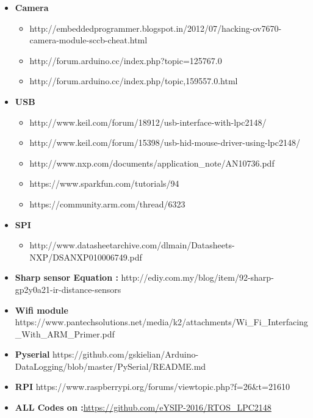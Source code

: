 \documentclass[11pt,a4paper]{book}
\begin{document}
\begin{itemize}
		\item \textbf{Camera}
		\begin{itemize}
			\item	http://embeddedprogrammer.blogspot.in/2012/07/hacking-ov7670-camera-module-sccb-cheat.html
			\item http://forum.arduino.cc/index.php?topic=125767.0
			\item	http://forum.arduino.cc/index.php/topic,159557.0.html 
		\end{itemize}
		
		\item \textbf{USB}
		\begin{itemize}
			\item	http://www.keil.com/forum/18912/usb-interface-with-lpc2148/
			\item	http://www.keil.com/forum/15398/usb-hid-mouse-driver-using-lpc2148/
			\item	http://www.nxp.com/documents/application\_note/AN10736.pdf
			\item	https://www.sparkfun.com/tutorials/94
			\item	https://community.arm.com/thread/6323
			
		\end{itemize}
		
		\item \textbf{SPI}
		\begin{itemize}
			\item http://www.datasheetarchive.com/dlmain/Datasheets-NXP/DSANXP010006749.pdf
			
		\end{itemize}
		
		
		
		\item \textbf{Sharp sensor Equation :}
		http://ediy.com.my/blog/item/92-sharp-gp2y0a21-ir-distance-sensors
		
		\item \textbf{Wifi module}
		https://www.pantechsolutions.net/media/k2/attachments/Wi\_Fi\_Interfacing\_With\_ARM\_Primer.pdf
		
		\item \textbf{Pyserial}
		https://github.com/gskielian/Arduino-DataLogging/blob/master/PySerial/README.md
		
		\item \textbf{RPI}
		https://www.raspberrypi.org/forums/viewtopic.php?f=26\&t=21610
	
		\item \textbf{\large{ALL Codes on :}}\href{https://github.com/eYSIP-2016/RTOS_LPC2148}{https://github.com/eYSIP-2016/RTOS\_LPC2148}
	\end{itemize}
	
	
\end{document}

